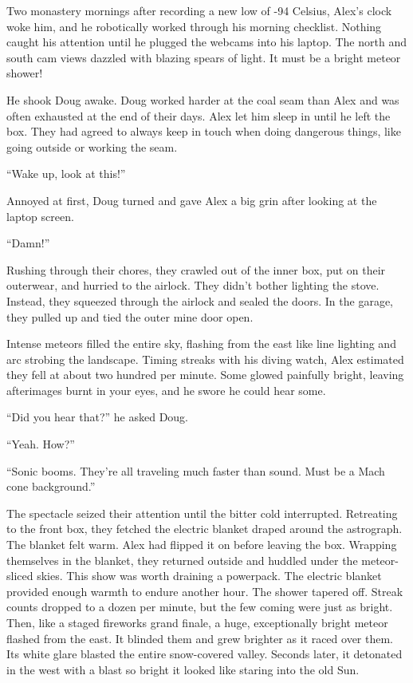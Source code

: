 Two monastery mornings after recording a new low of -94 Celsius, Alex's
clock woke him, and he robotically worked through his morning checklist.
Nothing caught his attention until he plugged the webcams into his
laptop. The north and south cam views dazzled with blazing spears of
light. It must be a bright meteor shower!

He shook Doug awake. Doug worked harder at the coal seam than Alex and
was often exhausted at the end of their days. Alex let him sleep in
until he left the box. They had agreed to always keep in touch when
doing dangerous things, like going outside or working the seam.

``Wake up, look at this!''

Annoyed at first, Doug turned and gave Alex a big grin after looking at
the laptop screen.

``Damn!''

Rushing through their chores, they crawled out of the inner box, put on
their outerwear, and hurried to the airlock. They didn't bother lighting
the stove. Instead, they squeezed through the airlock and sealed the
doors. In the garage, they pulled up and tied the outer mine door open.

Intense meteors filled the entire sky, flashing from the east like line
lighting and arc strobing the landscape. Timing streaks with his diving
watch, Alex estimated they fell at about two hundred per minute. Some
glowed painfully bright, leaving afterimages burnt in your eyes, and he
swore he could hear some.

``Did you hear that?'' he asked Doug.

``Yeah. How?''

``Sonic booms. They're all traveling much faster than sound. Must be a
Mach cone background.''

The spectacle seized their attention until the bitter cold interrupted.
Retreating to the front box, they fetched the electric blanket draped
around the astrograph. The blanket felt warm. Alex had flipped it on
before leaving the box. Wrapping themselves in the blanket, they
returned outside and huddled under the meteor-sliced skies. This show
was worth draining a powerpack. The electric blanket provided enough
warmth to endure another hour. The shower tapered off. Streak counts
dropped to a dozen per minute, but the few coming were just as bright.
Then, like a staged fireworks grand finale, a huge, exceptionally bright
meteor flashed from the east. It blinded them and grew brighter as it
raced over them. Its white glare blasted the entire snow-covered valley.
Seconds later, it detonated in the west with a blast so bright it looked
like staring into the old Sun.

